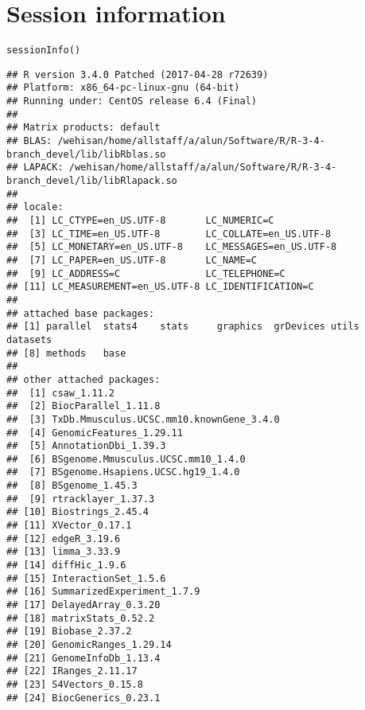 \documentclass{report}\usepackage[]{graphicx}\usepackage[usenames,dvipsnames]{color}
\newcommand{\hlstd}[1]{\textcolor[rgb]{0.251,0.251,0.251}{#1}}%
\newcommand{\hlkwd}[1]{\textcolor[rgb]{0.878,0.439,0.125}{#1}}%
\newenvironment{knitrout}{}{} %
\begin{document}
\section{Session information}
\begin{knitrout}
\color{fgcolor}\begin{kframe}
\begin{alltt}
\hlkwd{sessionInfo}\hlstd{()}
\end{alltt}
\begin{verbatim}
## R version 3.4.0 Patched (2017-04-28 r72639)
## Platform: x86_64-pc-linux-gnu (64-bit)
## Running under: CentOS release 6.4 (Final)
## 
## Matrix products: default
## BLAS: /wehisan/home/allstaff/a/alun/Software/R/R-3-4-branch_devel/lib/libRblas.so
## LAPACK: /wehisan/home/allstaff/a/alun/Software/R/R-3-4-branch_devel/lib/libRlapack.so
## 
## locale:
##  [1] LC_CTYPE=en_US.UTF-8       LC_NUMERIC=C              
##  [3] LC_TIME=en_US.UTF-8        LC_COLLATE=en_US.UTF-8    
##  [5] LC_MONETARY=en_US.UTF-8    LC_MESSAGES=en_US.UTF-8   
##  [7] LC_PAPER=en_US.UTF-8       LC_NAME=C                 
##  [9] LC_ADDRESS=C               LC_TELEPHONE=C            
## [11] LC_MEASUREMENT=en_US.UTF-8 LC_IDENTIFICATION=C       
## 
## attached base packages:
## [1] parallel  stats4    stats     graphics  grDevices utils     datasets 
## [8] methods   base     
## 
## other attached packages:
##  [1] csaw_1.11.2                             
##  [2] BiocParallel_1.11.8                     
##  [3] TxDb.Mmusculus.UCSC.mm10.knownGene_3.4.0
##  [4] GenomicFeatures_1.29.11                 
##  [5] AnnotationDbi_1.39.3                    
##  [6] BSgenome.Mmusculus.UCSC.mm10_1.4.0      
##  [7] BSgenome.Hsapiens.UCSC.hg19_1.4.0       
##  [8] BSgenome_1.45.3                         
##  [9] rtracklayer_1.37.3                      
## [10] Biostrings_2.45.4                       
## [11] XVector_0.17.1                          
## [12] edgeR_3.19.6                            
## [13] limma_3.33.9                            
## [14] diffHic_1.9.6                           
## [15] InteractionSet_1.5.6                    
## [16] SummarizedExperiment_1.7.9              
## [17] DelayedArray_0.3.20                     
## [18] matrixStats_0.52.2                      
## [19] Biobase_2.37.2                          
## [20] GenomicRanges_1.29.14                   
## [21] GenomeInfoDb_1.13.4                     
## [22] IRanges_2.11.17                         
## [23] S4Vectors_0.15.8                        
## [24] BiocGenerics_0.23.1                     

\end{verbatim}
\end{kframe}
\end{knitrout}
\end{document}

